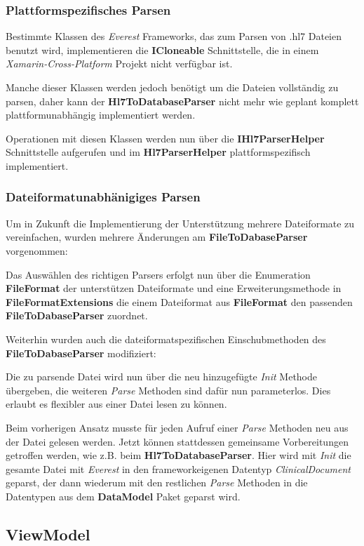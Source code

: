 \documentclass[a4paper]{scrreprt}
\begin{document}
\subsubsection{Plattformspezifisches Parsen}
Bestimmte Klassen des \textit{Everest} Frameworks, das zum Parsen von .hl7 Dateien benutzt wird, implementieren die \textbf{ICloneable} Schnittstelle, die in einem \textit{Xamarin-Cross-Platform} Projekt nicht verfügbar ist. 

Manche dieser Klassen werden jedoch benötigt um die Dateien vollständig zu parsen, daher kann der \textbf{Hl7ToDatabaseParser} nicht mehr wie geplant komplett plattformunabhängig implementiert werden.

Operationen mit diesen Klassen werden nun über die \textbf{IHl7ParserHelper} Schnittstelle aufgerufen und im \textbf{Hl7ParserHelper} plattformspezifisch implementiert.

\subsubsection{Dateiformatunabhänigiges Parsen}
Um in Zukunft die Implementierung der Unterstützung mehrere Dateiformate zu vereinfachen, wurden mehrere Änderungen am \textbf{FileToDabaseParser} vorgenommen:

Das Auswählen des richtigen Parsers erfolgt nun über die Enumeration \textbf{FileFormat} der unterstützen Dateiformate und eine Erweiterungsmethode in \textbf{FileFormatExtensions} die einem Dateiformat aus \textbf{FileFormat} den passenden \textbf{FileToDabaseParser} zuordnet.

Weiterhin wurden auch die dateiformatspezifischen Einschubmethoden des \textbf{FileToDabaseParser} modifiziert: 

Die zu parsende Datei wird nun über die neu hinzugefügte \textit{Init} Methode übergeben, die weiteren \textit{Parse} Methoden sind dafür nun parameterlos. Dies erlaubt es flexibler aus einer Datei lesen zu können. 

Beim vorherigen Ansatz musste für jeden Aufruf einer \textit{Parse} Methoden neu aus der Datei gelesen werden. Jetzt können stattdessen gemeinsame Vorbereitungen getroffen werden, wie z.B. beim \textbf{Hl7ToDatabaseParser}. Hier wird mit \textit{Init} die gesamte Datei mit \textit{Everest} in den frameworkeigenen Datentyp \textit{ClinicalDocument} geparst, der dann wiederum mit den restlichen \textit{Parse} Methoden in die Datentypen aus dem \textbf{DataModel} Paket geparst wird.

\subsection{ViewModel}
\end{document}
